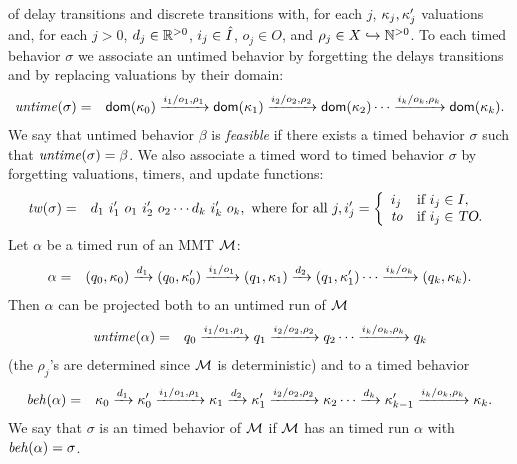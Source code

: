 of delay transitions and discrete transitions with, for each $j$,
$\kappa_j, \kappa'_j$ valuations and,
for each $j>0$,  $d_j \in {\mathbb R}^{> 0}$, $i_j \in \hat{I}$, $o_j \in O$, and $\rho_j \in X \hookrightarrow {\mathbb N}^{>0}$.
To each timed behavior $\sigma$ we associate an untimed behavior by forgetting the
delays transitions and by replacing valuations by their domain:
\begin{eqnarray*}
\mathit{untime}(\sigma) & = & {\textsf{dom}}(\kappa_0) \xrightarrow{i_1/o_1, \rho_1} {\textsf{dom}}(\kappa_1)  \xrightarrow{i_2/o_2, \rho_2} {\textsf{dom}}(\kappa_2) \cdots \xrightarrow{i_k/o_k, \rho_k} {\textsf{dom}}(\kappa_k).
\end{eqnarray*}
We say that untimed behavior $\beta$ is \emph{feasible} if there exists a timed behavior $\sigma$ such that $\mathit{untime}(\sigma) = \beta$.
We also associate a timed word to timed behavior $\sigma$ by forgetting valuations, timers, and update functions:
\begin{eqnarray*}
\mathit{tw}(\sigma) & = & d_ 1 ~ i'_1 ~ o_1 ~ i'_2 ~ o_2 \cdots d_k ~ i'_k ~ o_k, \mbox{ where for all } j,
i'_j  =  \left\{ \begin{array}{ll}
i_j & \mbox{if } i_j \in I,\\
\mathit{to} & \mbox{if } i_j \in \mbox{\sl TO}.
\end{array} \right.
\end{eqnarray*} 
Let $\alpha$ be a timed run of an MMT ${\cal M}$: 
\begin{eqnarray*}
\alpha & = & (q_0, \kappa_0) \xrightarrow{d_1} (q_0, \kappa'_0) \xrightarrow{i_1/o_1} (q_1, \kappa_1) \xrightarrow{d_2} (q_1, \kappa'_1)  \cdots
 \xrightarrow{i_k/o_k} (q_k, \kappa_k).
\end{eqnarray*}
Then $\alpha$ can be projected both to an untimed run of ${\cal M}$
\begin{eqnarray*}
\mathit{untime} (\alpha) & = & q_0 \xrightarrow{i_1/o_1, \rho_1} q_1  \xrightarrow{i_2/o_2, \rho_2} q_2 \cdots \xrightarrow{i_k/o_k, \rho_k} q_k
\end{eqnarray*}
(the $\rho_j$'s are determined since ${\cal M}$ is deterministic) and to a timed behavior
\begin{eqnarray*}
\mathit{beh}(\alpha) & = & \kappa_0 \xrightarrow{d_1} \kappa'_0 \xrightarrow{i_1/o_1, \rho_1} \kappa_1 \xrightarrow{d_2} \kappa'_1 \xrightarrow{i_2/o_2, \rho_2} \kappa_2 \cdots
\xrightarrow{d_k} \kappa'_{k-1} \xrightarrow{i_k/o_k, \rho_k} \kappa_{k}.
\end{eqnarray*}
\iflong
We say that $\sigma$ is an timed behavior of ${\cal M}$ if ${\cal M}$ has an timed run $\alpha$ with $\mathit{beh}(\alpha) = \sigma$.
